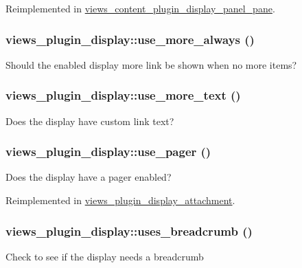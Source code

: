 Reimplemented in \hyperlink{classviews__content__plugin__display__panel__pane_a4d0a60ad1d64917b0e90495bd7fe5f30}{views\_\-content\_\-plugin\_\-display\_\-panel\_\-pane}.\hypertarget{classviews__plugin__display_aaa957375d149f787d53ba6b187dc35bf}{
\subsubsection[{use\_\-more\_\-always}]{\setlength{\rightskip}{0pt plus 5cm}views\_\-plugin\_\-display::use\_\-more\_\-always ()}}
\label{classviews__plugin__display_aaa957375d149f787d53ba6b187dc35bf}
Should the enabled display more link be shown when no more items? \hypertarget{classviews__plugin__display_a1681009bc05853c13f13e24ee94c2800}{
\subsubsection[{use\_\-more\_\-text}]{\setlength{\rightskip}{0pt plus 5cm}views\_\-plugin\_\-display::use\_\-more\_\-text ()}}
\label{classviews__plugin__display_a1681009bc05853c13f13e24ee94c2800}
Does the display have custom link text? \hypertarget{classviews__plugin__display_aaae358d9672426a81a1733a0236019b8}{
\subsubsection[{use\_\-pager}]{\setlength{\rightskip}{0pt plus 5cm}views\_\-plugin\_\-display::use\_\-pager ()}}
\label{classviews__plugin__display_aaae358d9672426a81a1733a0236019b8}
Does the display have a pager enabled? 

Reimplemented in \hyperlink{classviews__plugin__display__attachment_a0a08a465f715c107a2dfaf9bd5dd1538}{views\_\-plugin\_\-display\_\-attachment}.\hypertarget{classviews__plugin__display_ab3d2779948700bcc6c5ee3b26726f468}{
\subsubsection[{uses\_\-breadcrumb}]{\setlength{\rightskip}{0pt plus 5cm}views\_\-plugin\_\-display::uses\_\-breadcrumb ()}}
\label{classviews__plugin__display_ab3d2779948700bcc6c5ee3b26726f468}
Check to see if the display needs a breadcrumb

